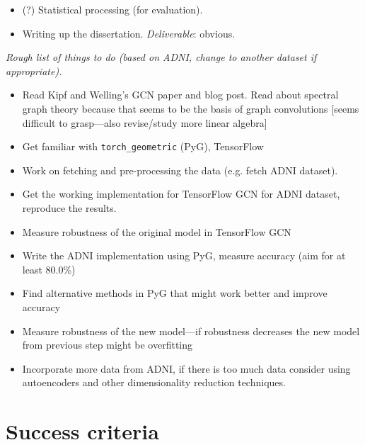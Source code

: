 \documentclass[12pt,a4paper,twoside]{article}
\begin{document}
\begin{itemize}
  \item (?) Statistical processing (for evaluation).
  \item Writing up the dissertation. \textit{Deliverable}: obvious.
\end{itemize}


\textit{Rough list of things to do (based on ADNI, change to another dataset if appropriate).}
\begin{itemize}
  \item Read Kipf and Welling's GCN paper \cite{kipf2017semi} and blog post. Read about spectral graph theory because that seems to be the basis of graph convolutions [seems difficult to grasp—also revise/study more linear algebra]
  \item Get familiar with \texttt{torch\_geometric} (PyG), TensorFlow
  \item Work on fetching and pre-processing the data (e.g. fetch ADNI dataset).
  \item Get the working implementation for TensorFlow GCN for ADNI dataset, reproduce the results.
  \item Measure robustness of the original model in TensorFlow GCN
  \item Write the ADNI implementation using PyG, measure accuracy (aim for at least 80.0\%)
  \item Find alternative methods in PyG that might work better and improve accuracy
  \item Measure robustness of the new model—if robustness decreases the new model from previous step might be overfitting
  \item Incorporate more data from ADNI, if there is too much data consider using autoencoders and other dimensionality reduction techniques.
\end{itemize}

\section*{Success criteria}


\end{document}
